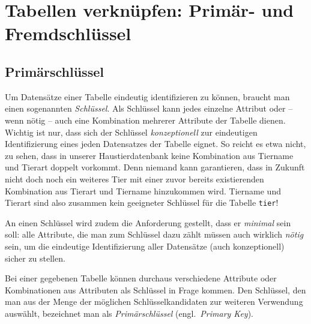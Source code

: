 \clearpage

\rehead[]{\textcolor{lightblue}{AvHG, Inf, My}}
\lohead[]{\textcolor{lightblue}{AvHG, Inf, My}}

\section{Tabellen verknüpfen: Primär- und Fremdschlüssel}

\subsection{Primärschlüssel}

Um Datensätze einer Tabelle eindeutig identifizieren zu können, braucht man
einen sogenannten \emph{Schlüssel}. Als Schlüssel kann jedes einzelne Attribut
oder -- wenn nötig -- auch eine Kombination mehrerer Attribute der Tabelle
dienen. Wichtig ist nur, dass sich der Schlüssel \emph{konzeptionell} zur
eindeutigen Identifizierung eines jeden Datensatzes der Tabelle eignet.
So reicht es etwa nicht, zu sehen, dass in unserer Haustierdatenbank keine
Kombination aus Tiername und Tierart doppelt vorkommt. Denn niemand kann
garantieren, dass in Zukunft nicht doch noch ein weiteres Tier mit einer zuvor
bereits existierenden Kombination aus Tierart und Tiername hinzukommen wird.
Tiername und Tierart sind also zusammen kein geeigneter Schlüssel für die
Tabelle \lstinline|tier|!

An einen Schlüssel wird zudem die Anforderung gestellt, dass er \emph{minimal}
sein soll: alle Attribute, die man zum Schlüssel dazu zählt müssen auch wirklich
\emph{nötig} sein, um die eindeutige Identifizierung aller Datensätze (auch
konzeptionell) sicher zu stellen.

Bei einer gegebenen Tabelle können durchaus verschiedene Attribute oder
Kombinationen aus Attributen als Schlüssel in Frage kommen. Den Schlüssel, den
man aus der Menge der möglichen Schlüsselkandidaten zur weiteren Verwendung
auswählt, bezeichnet man als \emph{Primärschlüssel} (engl.\ \emph{Primary Key}).

